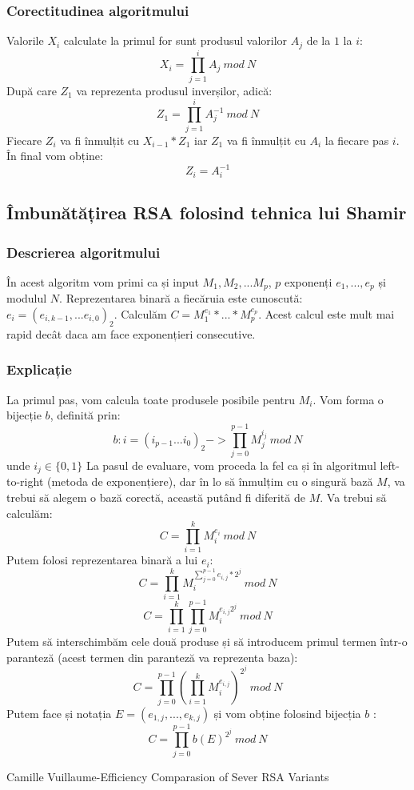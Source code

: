 \documentclass[12]{report}
\begin{document}
		   \subsubsection{Corectitudinea algoritmului}
		   Valorile $X_i$ calculate la primul for sunt produsul valorilor $A_j$ de la $1$ la $i$:
		   $$ X_i=\prod_{j=1}^{i} A_j \ mod \ N$$
		   După care $Z_1$ va reprezenta produsul inverșilor, adică:
		   $$Z_1=\prod_{j=1}^{i} A_{j}^{-1} \ mod \ N$$
		   Fiecare $Z_i$ va fi înmulțit cu $X_{i-1} * Z_1$ iar $Z_1$ va fi înmulțit cu $A_i$ la fiecare pas $i$. În final vom obține:
		   $$Z_i=A_{i}^{-1}$$ 
		   \subsection{Îmbunătățirea RSA folosind tehnica lui Shamir}
		   \subsubsection{Descrierea algoritmului}
		   În acest algoritm vom primi ca și input $M_1,M_2,...M_p$, $p$ exponenți $e_1,...,e_p$ și modulul $N$. Reprezentarea binară a fiecăruia este cunoscută: $e_i=(e_{i,k-1},...e_{i,0})_2$. Calculăm $C=M_{1}^{e_1}*...*M_{p}^{e_p}$. Acest calcul este mult mai rapid decât daca am face exponențieri consecutive.
		   \subsubsection{Explicație}
		   La primul pas, vom calcula toate produsele posibile pentru $M_i$. Vom forma o bijecție $b$, definită prin: \\
		   $$b:i=(i_{p-1}...i_0)_2 -> \prod_{j=0}^{p-1} M_{j}^{i_j} \ mod \ N$$
		   unde $i_j \in \lbrace  0,1  \rbrace $
		   La pasul de evaluare, vom proceda la fel ca și în algoritmul left-to-right (metoda de exponențiere), dar în lo să înmulțim cu o singură bază $M$, va trebui să alegem o bază corectă, această putând fi diferită de $M$. Va trebui să calculăm: 
		   $$ C = \prod_{i=1}^{k} M_{i}^{e_i} \ mod \ N$$
		   Putem folosi reprezentarea binară a lui $e_i$:
		   $$ C = \prod_{i=1}^{k} M_{i}^{\sum_{j=0}^{p-1} e_{i,j} * 2^j} \ mod \ N$$
		   $$ C = \prod_{i=1}^{k} \prod_{j=0}^{p-1} M_{i}^{e_{i,j}2^j} \ mod \ N$$
		   Putem să interschimbăm cele două produse și să introducem primul termen într-o paranteză (acest termen din paranteză va reprezenta baza):
		   $$C = \prod_{j=0}^{p-1} \left(   \prod_{i=1}^{k} M_{i}^{e_{i,j}}     \right)^{2^j} \ mod \ N $$
		   Putem face și notația $E=(e_{1,j},...,e_{k,j})$ și vom obține folosind bijecția $b$ :
		   $$ C = \prod_{j=0}^{p-1} b(E)^{2^j}  \ mod \ N$$
	
		  
	     
	
	    
	  

\medskip


\begin{thebibliography}{9}
Camille Vuillaume-Efficiency Comparasion of Sever RSA Variants
\end{thebibliography}
\end{document}
